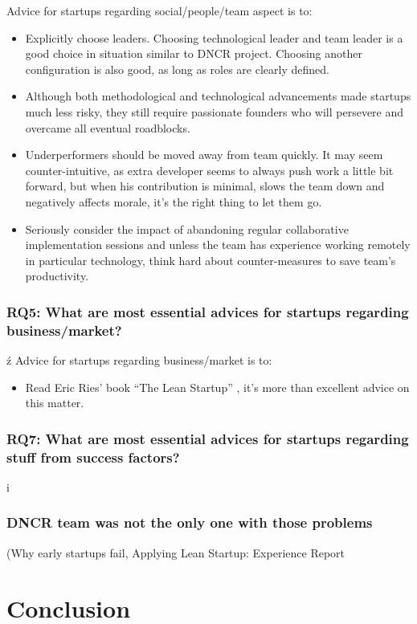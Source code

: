\documentclass{article}
\begin{document}
Advice for startups regarding social/people/team aspect is to:
\begin{itemize}
\item Explicitly choose leaders. Choosing technological leader and team leader is a good choice in situation similar to DNCR project. Choosing another configuration is also good, as long as roles are clearly defined.
\item Although both methodological and technological advancements made startups much less risky, they still require passionate founders who will persevere and overcame all eventual roadblocks.
\item Underperformers should be moved away from team quickly. It may seem counter-intuitive, as extra developer seems to always push work a little bit forward, but when his contribution is minimal, slows the team down and negatively affects morale, it's the right thing to let them go.
\item Seriously consider the impact of abandoning regular collaborative implementation sessions and unless the team has experience working remotely in particular technology, think hard about counter-measures to save team's productivity.
\end{itemize}

\subsubsection{RQ5: What are most essential advices for startups regarding business/market?}ź
Advice for startups regarding business/market is to:
\begin{itemize}
\item Read Eric Ries' book ``The Lean Startup'' \cite{ries2011lean}, it's more than excellent advice on this matter.
\end{itemize}

\subsubsection{RQ7: What are most essential advices for startups regarding stuff from success factors?}
i

\subsubsection{DNCR team was not the only one with those problems}
(Why early startups fail, Applying Lean Startup: Experience Report

\section{Conclusion}
\end{document}
